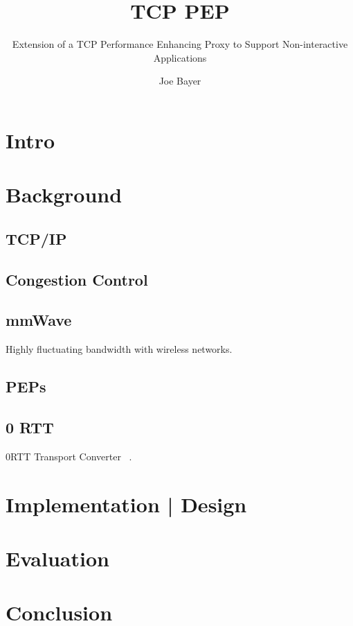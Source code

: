 \documentclass[a4paper,english, 11pt]{report}
\author{Joe Bayer}
\title{TCP PEP}
\subtitle{Extension of a TCP Performance Enhancing Proxy to
Support Non-interactive Applications}
\begin{document}
\uiomasterfp[program={Informatikk: programmering og systemarkitektur}, supervisor={Michael Welzl}]

\tableofcontents

\chapter{Intro}

\chapter{Background}

\section{TCP/IP}

\section{Congestion Control}

\section{mmWave}
Highly fluctuating bandwidth with wireless networks.
\section{PEPs}

\section{0 RTT}

0RTT Transport Converter ~\cite{rfc8803}.


\chapter{Implementation | Design}
\chapter{Evaluation}
\chapter{Conclusion}

{}

\end{document}
